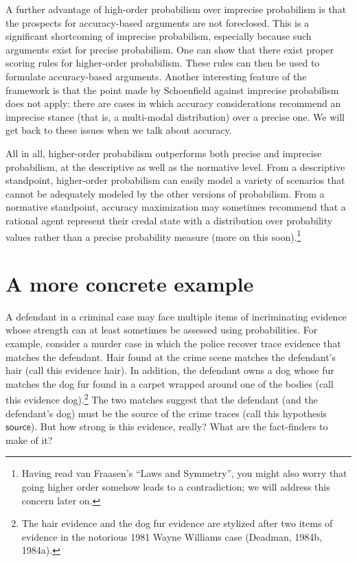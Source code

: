 \documentclass[
  10pt,
  dvipsnames,enabledeprecatedfontcommands]{scrartcl}
\begin{document}
A further advantage of high-order probabilism over imprecise probabilism
is that the prospects for accuracy-based arguments are not foreclosed.
This is a significant shortcoming of imprecise probabilism, especially
because such arguments exist for precise probabilism. One can show that
there exist proper scoring rules for higher-order probabilism. These
rules can then be used to formulate accuracy-based arguments. Another
interesting feature of the framework is that the point made by
Schoenfield against imprecise probabilism does not apply: there are
cases in which accuracy considerations recommend an imprecise stance
(that is, a multi-modal distribution) over a precise one. We will get
back to these issues when we talk about accuracy.

All in all, higher-order probabilism outperforms both precise and
imprecise probabilism, at the descriptive as well as the normative
level. From a descriptive standpoint, higher-order probabilism can
easily model a variety of scenarios that cannot be adequately modeled by
the other versions of probabilism. From a normative standpoint, accuracy
maximization may sometimes recommend that a rational agent represent
their credal state with a distribution over probability values rather
than a precise probability
measure
(more on this soon).\footnote{Having read van Fraasen's ``Laws and
  Symmetry'', you might also worry that going higher order somehow leads
  to a contradiction; we will address this concern later on.}

\hypertarget{a-more-concrete-example}{%
\section{A more concrete example}\label{a-more-concrete-example}}

A defendant in a criminal case may face multiple items of incriminating
evidence whose strength can at least sometimes be assessed using
probabilities. For example, consider a murder case in which the police
recover trace evidence that matches the defendant. Hair found at the
crime scene matches the defendant's hair (call this evidence
\textsf{hair}). In addition, the defendant owns a dog whose fur matches
the dog fur found in a carpet wrapped around one of the bodies (call
this evidence \textsf{dog}).\footnote{The hair evidence and the dog fur
  evidence are stylized after two items of evidence in the notorious
  1981 Wayne Williams case (Deadman, 1984b, 1984a).} The two matches
suggest that the defendant (and the defendant's dog) must be the source
of the crime traces (call this hypothesis \(\mathsf{source}\)). But how
strong is this evidence, really? What are the fact-finders to make of
it?
\end{document}
